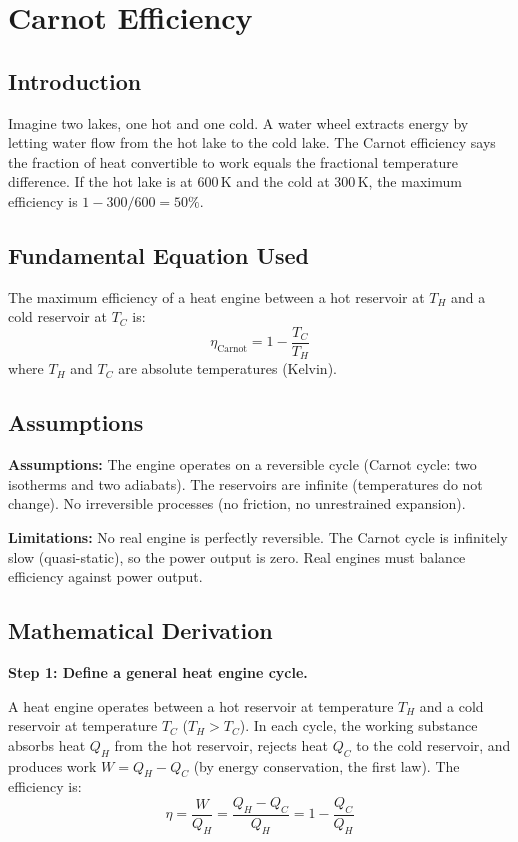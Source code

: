 \documentclass[11pt,openright]{book}
\begin{document}

\chapter{Carnot Efficiency}

\section*{Introduction}

Imagine two lakes, one hot and one cold. A water wheel extracts energy by letting water flow from the hot lake to the cold lake. The Carnot efficiency says the fraction of heat convertible to work equals the fractional temperature difference. If the hot lake is at 600\,K and the cold at 300\,K, the maximum efficiency is $1 - 300/600 = 50\%$.
\section*{Fundamental Equation Used}

The maximum efficiency of a heat engine between a hot reservoir at $T_H$ and a cold reservoir at $T_C$ is:
\[
\eta_{\text{Carnot}} = 1 - \frac{T_C}{T_H}
\]
where $T_H$ and $T_C$ are absolute temperatures (Kelvin).
\section*{Assumptions}

\textbf{Assumptions:} The engine operates on a reversible cycle (Carnot cycle: two isotherms and two adiabats). The reservoirs are infinite (temperatures do not change). No irreversible processes (no friction, no unrestrained expansion).


\textbf{Limitations:} No real engine is perfectly reversible. The Carnot cycle is infinitely slow (quasi-static), so the power output is zero. Real engines must balance efficiency against power output.


\section*{Mathematical Derivation}

\textbf{Step 1: Define a general heat engine cycle.}

A heat engine operates between a hot reservoir at temperature $T_H$ and a cold reservoir at temperature $T_C$ ($T_H > T_C$). In each cycle, the working substance absorbs heat $Q_H$ from the hot reservoir, rejects heat $Q_C$ to the cold reservoir, and produces work $W = Q_H - Q_C$ (by energy conservation, the first law). The efficiency is:
\begin{equation}
\eta = \frac{W}{Q_H} = \frac{Q_H - Q_C}{Q_H} = 1 - \frac{Q_C}{Q_H}
\end{equation}
\end{document}
